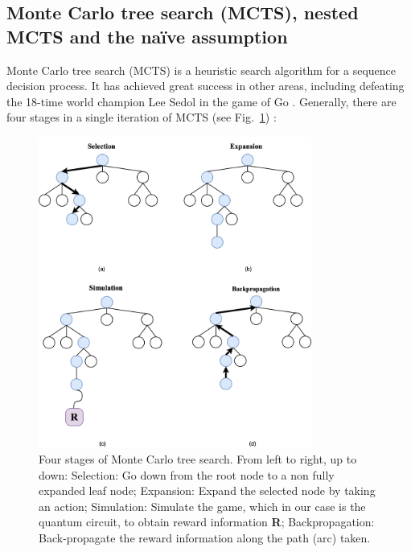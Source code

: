 \documentclass[a4paper,onecolumn,11pt]{quantumarticle}
\begin{document}
\subsection{Monte Carlo tree search (MCTS), nested MCTS and the na\"ive assumption}
Monte Carlo tree search (MCTS) is a heuristic search algorithm for a sequence decision process. It has achieved great success in other areas, including defeating the 18-time world champion Lee Sedol in the game of Go \cite{AlphaGoDBLP:journals/nature/SilverHMGSDSAPL16, AlphaGoZeroDBLP:journals/nature/SilverSSAHGHBLB17}. Generally, there are four stages in a single iteration of MCTS (see Fig.~\ref{fig:mcts}) \cite{MCTS_for_game10.5555/3022539.3022579}:
\begin{figure}[]
  \centering
  \includegraphics[width=0.8\textwidth]{Figures/mcts.png}
  \caption{Four stages of Monte Carlo tree search. From left to right, up to down: Selection: Go down from the root node to a non fully expanded leaf node; Expansion: Expand the selected node by taking an action; Simulation: Simulate the game, which in our case is the quantum circuit, to obtain reward information \textbf{R}; Backpropagation: Back-propagate the reward information along the path (arc) taken.}
  \label{fig:mcts}
\end{figure}
\end{document}
